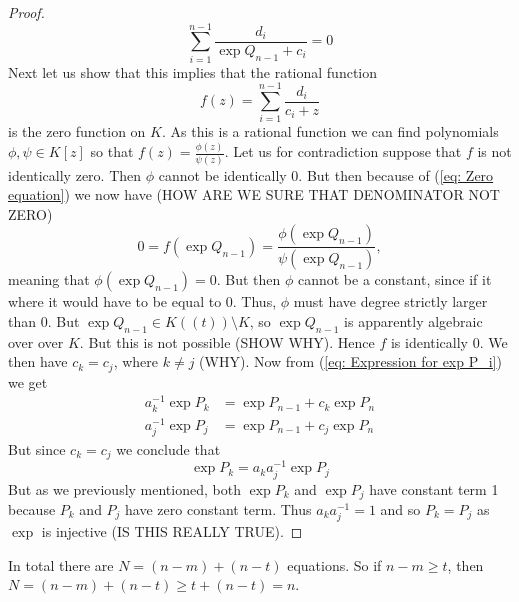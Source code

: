 \documentclass{article}
\begin{document}
\begin{proof}
    \begin{equation}\label{eq: Zero equation}
        \sum_{i=1}^{n-1} \frac{d_i}{\exp Q_{n-1} + c_i} = 0
    \end{equation}
    Next let us show that this implies that the rational function 
    $$f(z) = \sum_{i=1}^{n-1}\frac{d_i}{c_i + z}$$
    is the zero function on $K$. As this is a rational function we can find polynomials $\phi, \psi \in K[z]$ so that $f(z) = \frac{\phi(z)}{\psi(z)}$. Let us for contradiction suppose that $f$ is not identically zero. Then $\phi$ cannot be identically 0. But then because of (\ref{eq: Zero equation}) we now have (HOW ARE WE SURE THAT DENOMINATOR NOT ZERO)
    $$0 = f(\exp Q_{n-1}) = \frac{\phi(\exp Q_{n-1})}{\psi(\exp Q_{n-1})},$$
    meaning that $\phi(\exp Q_{n-1}) = 0$. But then $\phi$ cannot be a constant, since if it where it would have to be equal to 0. Thus, $\phi$ must have degree strictly larger than 0. But $\exp Q_{n-1} \in K((t)) \setminus K$, so $\exp Q_{n-1}$ is apparently algebraic over over $K$. But this is not possible (SHOW WHY). Hence $f$ is identically 0. We then have $c_k = c_j$, where $k \neq j$ (WHY). Now from (\ref{eq: Expression for exp P_i}) we get 
    \begin{align*}
        a_k^{-1} \exp P_k &= \exp P_{n-1} + c_k \exp P_n \\
        a_j^{-1} \exp P_j &= \exp P_{n-1} + c_j \exp P_n
    \end{align*}
    But since $c_k = c_j$ we conclude that
    $$\exp P_k = a_k a_j^{-1} \exp P_j$$ 
    But as we previously mentioned, both $\exp P_k$ and $\exp P_j$ have constant term 1 because $P_k$ and $P_j$ have zero constant term. Thus $a_k a_j^{-1} = 1$ and so $P_k = P_j$ as $\exp$ is injective (IS THIS REALLY TRUE).
\end{proof}

In total there are $N = (n - m) + (n - t)$ equations. So if $n - m \geq t$, then $N = (n - m) + (n - t) \geq t + (n - t) = n$.
\end{document}
